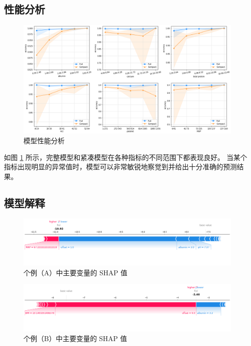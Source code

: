 \subsection{性能分析}

\begin{figure}[htb]
    \centering
    \includegraphics[width=\linewidth]{../img/eicu_performance.png}
    \caption{模型性能分析}
    \label{figure:model-performance}
\end{figure}

如图 \ref{figure:model-performance} 所示，完整模型和紧凑模型在各种指标的不同范围下都表现良好。%
当某个指标出现明显的异常值时，模型可以非常敏锐地察觉到并给出十分准确的预测结果。

\subsection{模型解释}

\begin{figure}[htb]
    \centering
    \includegraphics[width=\linewidth]{../img/eicu_compact_shap_force_neg.png}
    \vspace{-4em}
    \caption{个例（A）中主要变量的 SHAP 值}
    \label{figure:shap-neg}
\end{figure}

\begin{figure}[htb]
    \centering
    \includegraphics[width=\linewidth]{../img/eicu_compact_shap_force_pos.png}
    \vspace{-4em}
    \caption{个例（B）中主要变量的 SHAP 值}
    \label{figure:shap-pos}
\end{figure}

